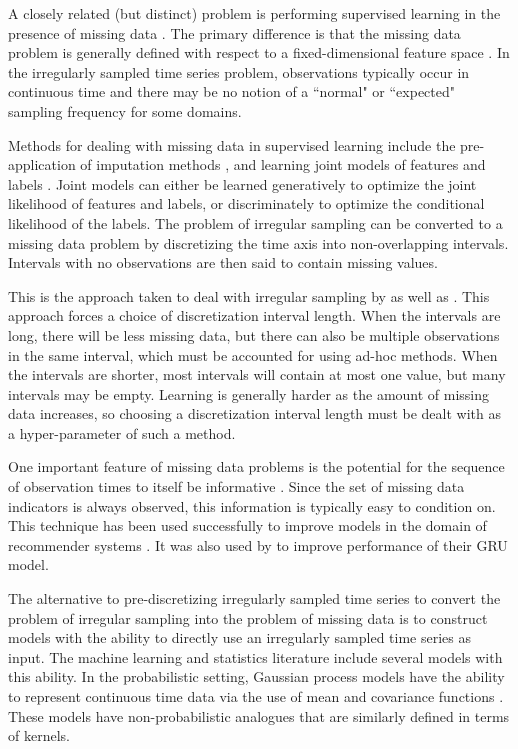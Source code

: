 \documentclass{article} \usepackage{iclr2019_conference,times}
\begin{document}
A closely related (but distinct) problem is performing supervised learning in the
presence of missing data \citep{batista2003analysis}. The primary difference is that
the missing data problem is generally defined with respect to
a fixed-dimensional feature space \citep{little2014statistical}. In the irregularly 
sampled time series problem, observations typically 
occur in continuous time and there may be no notion of 
a ``normal" or ``expected" sampling frequency for some
domains. 

Methods for dealing with missing data in supervised learning 
include the pre-application of imputation methods
\citep{sterne2009multiple}, and learning 
joint models of features and labels \citep{williams2005incomplete}. Joint models can either 
be learned generatively to optimize the joint likelihood of 
features and labels, or discriminately to optimize the 
conditional likelihood of the labels. The problem of irregular
sampling can be converted to a missing data problem by discretizing 
the time axis into non-overlapping intervals. Intervals with no
observations are then said to contain missing values. 

This is the
approach taken to deal with irregular sampling by \cite{marlin-ihi2012}
as well as \cite{lipton2016directly}. This
approach forces a choice of discretization interval length.
When the intervals are long, there will be less missing data, but
there can also be multiple observations in the same interval, which
must be accounted for using ad-hoc methods. When the intervals are shorter,
most intervals will contain at most one value, but many intervals 
may be empty. Learning is generally harder as the amount of missing data
increases, so choosing a discretization interval length must be 
dealt with as a hyper-parameter of such a method.

One important feature of missing data problems is the potential for
the sequence of observation times to itself be informative
\citep{little2014statistical}. Since the set of missing data indicators 
is always observed, this information is typically easy to condition
on. This technique has been used successfully to improve models
in the domain of recommender systems \citep{salakhutdinov2007restricted}. 
It was also used by \cite{lipton2016directly} to improve performance
of their GRU model.

The alternative to pre-discretizing irregularly sampled time series to
convert the problem of irregular sampling into the problem of missing data
is to construct models with the ability to directly use
an irregularly sampled time series as input. The machine learning
and statistics literature include several models with this ability.
In the probabilistic setting, Gaussian process models have the ability
to represent continuous time data via the use of mean and covariance
functions \citep{rasmussen2006gaussian}. These models have non-probabilistic
analogues that are similarly defined in terms of kernels. 
\end{document}
